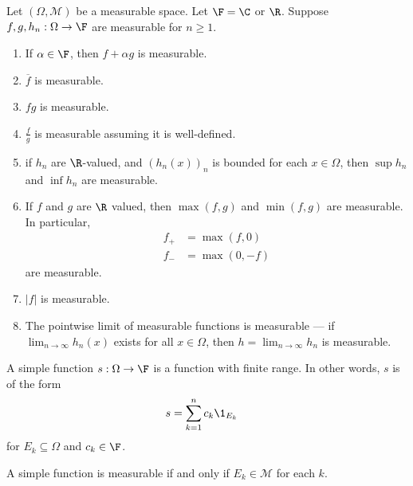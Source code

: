 \begin{proposition}
  Let $\left(\Omega,\mathcal{M}\right)$ be a measurable space. Let $\F = \C$ or $\R$. Suppose $f,g,h_n: \Omega\rightarrow \F$ are measurable for $n\geq 1$.
  \begin{enumerate}[(1)]
    \item If $\alpha \in \F$, then $f + \alpha g$ is measurable.
    \item $\overline{f}$ is measurable.
    \item $fg$ is measurable.
    \item $\frac{f}{g}$ is measurable assuming it is well-defined.
    \item if $h_n$ are $\R$-valued, and $\left(h_n\left(x\right)\right)_n$ is bounded for each $x\in \Omega$, then $\sup h_n$ and $\inf h_n$ are measurable.
    \item If $f$ and $g$ are $\R$ valued, then $\max\left(f,g\right)$ and $\min\left(f,g\right)$ are measurable. In particular,
      \begin{align*}
        f_{+} &= \max\left(f,0\right)\\
        f_{-} &= \max\left(0,-f\right)
      \end{align*}
      are measurable.
    \item $\left\vert f \right\vert$ is measurable.
    \item The pointwise limit of measurable functions is measurable --- if $\lim_{n\rightarrow\infty}h_n\left(x\right)$ exists for all $x\in \Omega$, then $h = \lim_{n\rightarrow\infty}h_n$ is measurable.
  \end{enumerate}
\end{proposition}
\begin{definition}
  A simple function $s: \Omega\rightarrow \F$ is a function with finite range. In other words, $s$ is of the form
  \begin{align*}
    s &= \sum_{k=1}^{n}c_k\1_{E_k}
  \end{align*}
  for $E_k\subseteq \Omega$ and $c_k\in \F$.\newline

  A simple function is measurable if and only if $E_k\in \mathcal{M}$ for each $k$.
\end{definition}

